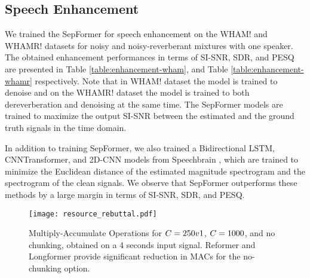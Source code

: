 \documentclass[lettersize,journal]{IEEEtran}
\begin{document}
\subsection{Speech Enhancement}
We trained the SepFormer for speech enhancement on the WHAM! and WHAMR! datasets for noisy and noisy-reverberant mixtures with one speaker. The obtained enhancement performances in terms of SI-SNR, SDR, and PESQ \cite{Pesq} are presented in Table \ref{table:enhancement-wham}, and Table \ref{table:enhancement-whamr} respectively. 
Note that in WHAM! dataset the model is trained to denoise and on the WHAMR! dataset the model is trained to both dereverberation and denoising at the same time. The SepFormer models are trained to maximize the output SI-SNR between the estimated and the ground truth signals in the time domain. 

In addition to training  SepFormer, we also trained a Bidirectional LSTM, CNNTransformer, and 2D-CNN models from Speechbrain \cite{speechbrain}, which are trained to minimize the Euclidean distance of the estimated magnitude spectrogram and the spectrogram of the clean signals. We observe that SepFormer outperforms these methods by a large margin in terms of SI-SNR, SDR, and PESQ.   


\begin{figure}[t]
    \centering
    \texttt{[image: resource\_rebuttal.pdf]}
    \caption{Multiply-Accumulate Operations for $C=250v1$, $C=1000$, and no chunking, obtained on a 4 seconds input signal. Reformer and Longformer provide significant reduction in MACs for the no-chunking option.}
    \label{fig:macs}
\end{figure}
\end{document}
